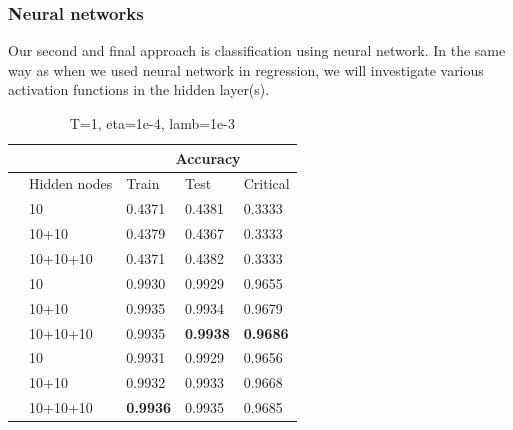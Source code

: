 \restoregeometry

\subsubsection{Neural networks}
Our second and final approach is classification using neural network. In the same way as when we used neural network in regression, we will investigate various activation functions in the hidden layer(s). 
\begin{table} [H]
	\caption{T=1, eta=1e-4, lamb=1e-3}
	\begin{tabularx}{\textwidth}{l|l|XXX} \hline\hline
		\label{tab:nn_class}
		&& \multicolumn{3}{c}{\textbf{Accuracy}}\\ \hline
		&Hidden nodes&Train&Test&Critical\\ \hline
		
		\parbox[t]{2mm}{}
		&10 & 0.4371 & 0.4381 & 0.3333 \\
		&10+10 & 0.4379 & 0.4367 & 0.3333 \\
		&10+10+10 & 0.4371 & 0.4382 & 0.3333 \\ \hline
		
		\parbox[t]{2mm}{}
		&10 & 0.9930 & 0.9929 & 0.9655 \\
		&10+10 & 0.9935 & 0.9934 & 0.9679 \\
		&10+10+10 & 0.9935 & \textbf{0.9938} & \textbf{0.9686} \\ \hline
		
		\parbox[t]{2mm}{}
		&10 & 0.9931 & 0.9929 & 0.9656 \\
		&10+10 & 0.9932 & 0.9933 & 0.9668 \\
		&10+10+10 & \textbf{0.9936} & 0.9935 & 0.9685 \\ \hline\hline
	\end{tabularx}
\end{table}

